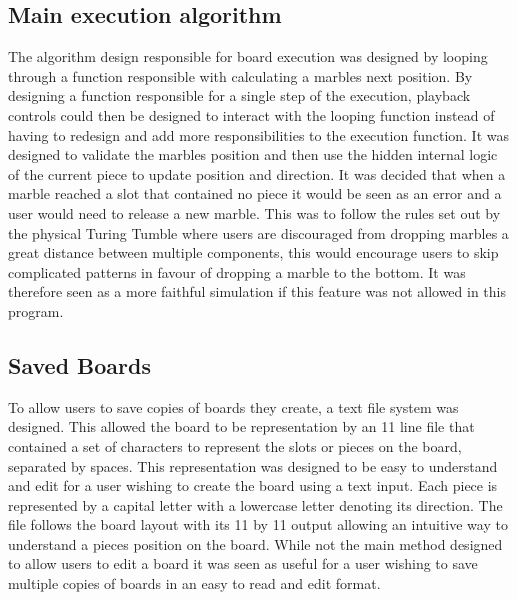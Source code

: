 \documentclass{l4proj}
\begin{document}
\subsection{Main execution algorithm}
The algorithm design responsible for board execution was designed by looping through a function responsible with calculating a marbles next position. By designing a function responsible for a single step of the execution, playback controls could then be designed to interact with the looping function instead of having to redesign and add more responsibilities to the execution function. It was designed to validate the marbles position and then use the hidden internal logic of the current piece to update position and direction. It was decided that when a marble reached a slot that contained no piece it would be seen as an error and a user would need to release a new marble. This was to follow the rules set out by the physical Turing Tumble where users are discouraged from dropping marbles a great distance between multiple components, this would encourage users to skip complicated patterns in favour of dropping a marble to the bottom. It was therefore seen as a more faithful simulation if this feature was not allowed in this program. 

\subsection{Saved Boards}
To allow users to save copies of boards they create, a text file system was designed. This allowed the board to be representation by an 11 line file that contained a set of characters to represent the slots or pieces on the board, separated by spaces. This representation was designed to be easy to understand and edit for a user wishing to create the board using a text input. Each piece is represented by a capital letter with a lowercase letter denoting its direction. The file follows the board layout with its 11 by 11 output allowing an intuitive way to understand a pieces position on the board. While not the main method designed to allow users to edit a board it was seen as useful for a user wishing to save multiple copies of boards in an easy to read and edit format.
\end{document}
